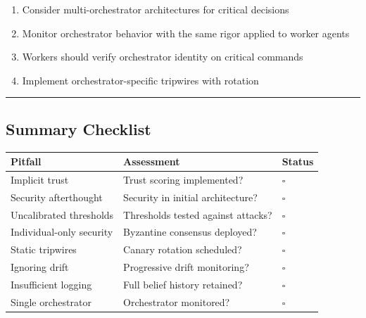 \documentclass[
]{article}
\newcounter{none} %
\providecommand{\tightlist}{%
  \setlength{\itemsep}{0pt}\setlength{\parskip}{0pt}}
\begin{document}
\begin{enumerate}
\def\labelenumi{\arabic{enumi}.}
\tightlist
\item
  Consider multi-orchestrator architectures for critical decisions
\item
  Monitor orchestrator behavior with the same rigor applied to worker
  agents
\item
  Workers should verify orchestrator identity on critical commands
\item
  Implement orchestrator-specific tripwires with rotation
\end{enumerate}

\begin{center}\rule{0.5\linewidth}{0.5pt}\end{center}

\subsection{Summary Checklist}\label{summary-checklist}

{\def\LTcaptype{none} %
\begin{longtable}[]{@{}
  >{\raggedright\arraybackslash}p{}
  >{\raggedright\arraybackslash}p{}
  >{\raggedright\arraybackslash}p{}@{}}
\toprule\noalign{}
\begin{minipage}[b]{\linewidth}\raggedright
Pitfall
\end{minipage} & \begin{minipage}[b]{\linewidth}\raggedright
Assessment
\end{minipage} & \begin{minipage}[b]{\linewidth}\raggedright
Status
\end{minipage} \\
\midrule\noalign{}
\endhead
\bottomrule\noalign{}
\endlastfoot
Implicit trust & Trust scoring implemented? & \(\square\) \\
Security afterthought & Security in initial architecture? &
\(\square\) \\
Uncalibrated thresholds & Thresholds tested against attacks? &
\(\square\) \\
Individual-only security & Byzantine consensus deployed? &
\(\square\) \\
Static tripwires & Canary rotation scheduled? & \(\square\) \\
Ignoring drift & Progressive drift monitoring? & \(\square\) \\
Insufficient logging & Full belief history retained? & \(\square\) \\
Single orchestrator & Orchestrator monitored? & \(\square\) \\
\end{longtable}
}
\end{document}
